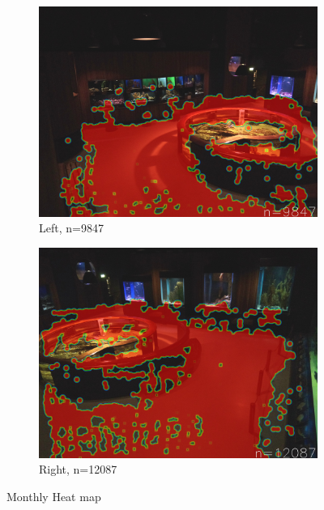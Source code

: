 \begin{figure}[H]
    \centering
    \begin{subfigure}{0.475\textwidth}
        \centering
        \includegraphics[width=\textwidth]{Images/Analytics/heatmap_left_all.jpg}
        \caption{Left, n=9847}
    \end{subfigure}
    \hfill
    \begin{subfigure}{0.475\textwidth}
        \centering
        \includegraphics[width=\textwidth]{Images/Analytics/heatmap_right_all.jpg}
        \caption{Right, n=12087}
    \end{subfigure}
    \caption{Monthly Heat map}
    \label{fig:heat_map_month}
\end{figure}

